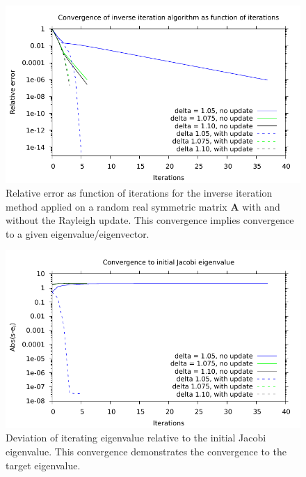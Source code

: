 \documentclass{article}
\begin{document}
	\begin{figure}
		\includegraphics[]{../Convergence3.pdf}
		\caption{Relative error as function of iterations for the inverse iteration method applied on a random real symmetric matrix $\mathbf{A}$ with and without the Rayleigh update. This convergence implies convergence to a given eigenvalue/eigenvector.}
		\label{fig:convergence3}
	\end{figure}
	\begin{figure}
		\includegraphics[]{../Convergence4.pdf}
		\caption{Deviation of iterating eigenvalue relative to the initial Jacobi eigenvalue. This convergence demonstrates the convergence to the target eigenvalue.}
		\label{fig:convergence4}
	\end{figure}
\end{document}
